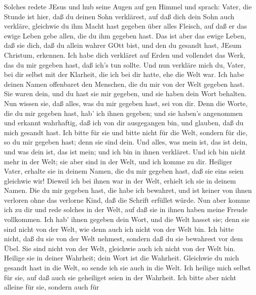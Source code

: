  Solches redete JEsus und hub seine Augen auf gen Himmel und
sprach: Vater, die Stunde ist hier, daß du deinen Sohn verklärest, auf
daß dich dein Sohn auch verkläre,  gleichwie du ihm Macht
hast gegeben über alles Fleisch, auf daß er das ewige Leben gebe allen,
die du ihm gegeben hast.  Das ist aber das ewige Leben, daß
sie dich, daß du allein wahrer GOtt bist, und den du gesandt hast, JEsum
Christum, erkennen.  Ich habe dich verkläret auf Erden und
vollendet das Werk, das du mir gegeben hast, daß ich's tun sollte.
 Und nun verkläre mich du, Vater, bei dir selbst mit der
Klarheit, die ich bei dir hatte, ehe die Welt war.  Ich habe
deinen Namen offenbaret den Menschen, die du mir von der Welt gegeben
hast. Sie waren dein, und du hast sie mir gegeben, und sie haben dein
Wort behalten.  Nun wissen sie, daß alles, was du mir
gegeben hast, sei von dir.  Denn die Worte, die du mir
gegeben hast, hab' ich ihnen gegeben; und sie haben's angenommen und
erkannt wahrhaftig, daß ich von dir ausgegangen bin, und glauben, daß du
mich gesandt hast.  Ich bitte für sie und bitte nicht für
die Welt, sondern für die, so du mir gegeben hast; denn sie sind dein.
 Und alles, was mein ist, das ist dein, und was dein ist,
das ist mein; und ich bin in ihnen verkläret.  Und ich bin
nicht mehr in der Welt; sie aber sind in der Welt, und ich komme zu dir.
Heiliger Vater, erhalte sie in deinem Namen, die du mir gegeben hast,
daß sie eins seien gleichwie wir!  Dieweil ich bei ihnen
war in der Welt, erhielt ich sie in deinem Namen. Die du mir gegeben
hast, die habe ich bewahret, und ist keiner von ihnen verloren ohne das
verlorne Kind, daß die Schrift erfüllet würde.  Nun aber
komme ich zu dir und rede solches in der Welt, auf daß sie in ihnen
haben meine Freude vollkommen.  Ich hab' ihnen gegeben dein
Wort, und die Welt hasset sie; denn sie sind nicht von der Welt, wie
denn auch ich nicht von der Welt bin.  Ich bitte nicht, daß
du sie von der Welt nehmest, sondern daß du sie bewahrest vor dem Übel.
 Sie sind nicht von der Welt, gleichwie auch ich nicht von
der Welt bin.  Heilige sie in deiner Wahrheit; dein Wort
ist die Wahrheit.  Gleichwie du mich gesandt hast in die
Welt, so sende ich sie auch in die Welt.  Ich heilige mich
selbst für sie, auf daß auch sie geheiliget seien in der Wahrheit.
 Ich bitte aber nicht alleine für sie, sondern auch für
